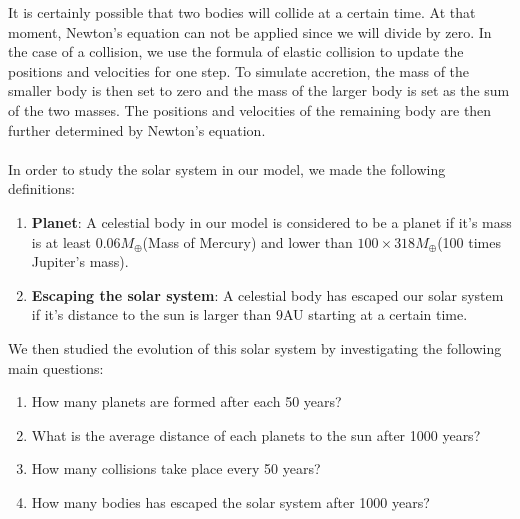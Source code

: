 It is certainly possible that two bodies will collide at a certain time. At that moment, Newton's equation can not be applied since we will divide by zero. In the case of a collision, we use the formula of elastic collision to update the positions and velocities for one step. 
To simulate accretion, the mass of the smaller body is then set to zero and the mass of the larger body is set as the sum of the two masses. The positions and velocities of the remaining body are then further determined by Newton's equation.\\
\\
In order to study the solar system in our model, we made the following definitions:\\
\begin{enumerate}
\item \textbf{Planet}: A celestial body in our model is considered to be a planet if it's mass is at least  0.06$M_{\oplus}$(Mass of Mercury) and lower than $100\times 318M_{\oplus}$(100 times Jupiter's mass).
\item \textbf{Escaping the solar system}: A celestial body has escaped our solar system if it's distance to the sun is larger than $9$AU starting at a certain time.
\end{enumerate}
We then studied the evolution of this solar system by investigating the following main questions:
\begin{enumerate}
	\item 	How many planets are formed after each 50 years? 

	\item What is the average distance of each planets to the sun after 1000 years?
	
	\item How many collisions take place every 50 years?
	
	\item How many bodies has escaped the solar system after 1000 years?
\end{enumerate}
 